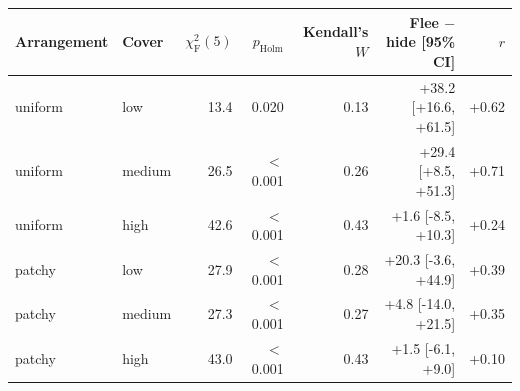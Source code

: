 \begin{tabular}{llrrrrr}
\toprule
Arrangement & Cover & $\chi^2_{\mathrm{F}}(5)$ & $p_\mathrm{Holm}$ & Kendall's $W$ & Flee $-$ hide [95\% CI] & $r$ \\
\midrule
uniform & low & 13.4 & 0.020 & 0.13 & +38.2 [+16.6, +61.5] & +0.62 \\
uniform & medium & 26.5 & $<$0.001 & 0.26 & +29.4 [+8.5, +51.3] & +0.71 \\
uniform & high & 42.6 & $<$0.001 & 0.43 & +1.6 [-8.5, +10.3] & +0.24 \\
patchy & low & 27.9 & $<$0.001 & 0.28 & +20.3 [-3.6, +44.9] & +0.39 \\
patchy & medium & 27.3 & $<$0.001 & 0.27 & +4.8 [-14.0, +21.5] & +0.35 \\
patchy & high & 43.0 & $<$0.001 & 0.43 & +1.5 [-6.1, +9.0] & +0.10 \\
\bottomrule
\end{tabular}
